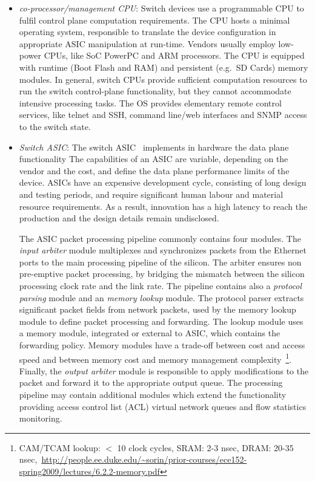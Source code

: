 \begin{itemize}
  \item \emph{co-processor/management CPU}: Switch devices use a programmable
    CPU to fulfil control plane computation requirements. The CPU hosts a
    minimal operating system, responsible to translate the device configuration in
    appropriate ASIC manipulation at run-time. Vendors usually employ low-power CPUs, like SoC
    PowerPC and ARM processors. The CPU is equipped with runtime
    (Boot Flash and RAM) and persistent (e.g.~SD Cards) memory modules. In general,
    switch CPUs provide sufficient computation resources to run the switch
    control-plane functionality, but they cannot accommodate intensive processing
    tasks. The OS provides elementary remote control services, like telnet and SSH,
    command line/web interfaces and SNMP access to the switch state. 
 
  \item \emph{Switch ASIC}: The switch ASIC~
    implements in hardware the data plane functionality  The capabilities of
    an ASIC are variable, depending on the vendor and the cost, and define the data
    plane performance limits of the device.  ASICs have an expensive
    development cycle, consisting of long design and
    testing periods, and require significant human labour and material resource
    requirements. As a result, innovation has a high latency to
    reach the production and the design details remain undisclosed.  

    The ASIC packet processing pipeline commonly contains four modules.  The
    \emph{input arbiter} module multiplexes and synchronizes packets from the
    Ethernet ports to the main processing pipeline of the silicon. The arbiter
    ensures non pre-emptive packet processing, by bridging the mismatch
    between the silicon processing clock rate and the link rate. The pipeline 
    contains also a \emph{protocol parsing} module and an
    \emph{memory lookup} module. The protocol parser extracts significant packet
    fields from network packets, used by the memory lookup module
    to define packet processing and forwarding.  The lookup module
    uses a memory module, integrated or external to ASIC, which contains 
    the forwarding policy.  Memory modules have a trade-off
    between cost and access speed and between memory cost and memory management
    complexity~\footnote{CAM/TCAM lookup: $<$ 10 clock cycles, SRAM: 2-3 nsec,
      DRAM: 20-35
      nsec,~\url{http://people.ee.duke.edu/~sorin/prior-courses/ece152-spring2009/lectures/6.2.2-memory.pdf}}.
    Finally, the \emph{output arbiter} module is responsible to apply modifications
    to the packet and forward it to the appropriate output queue.
    The processing pipeline may contain additional modules
    which extend the functionality providing
    access control list (ACL) virtual network queues and flow statistics
    monitoring.


\end{itemize}
